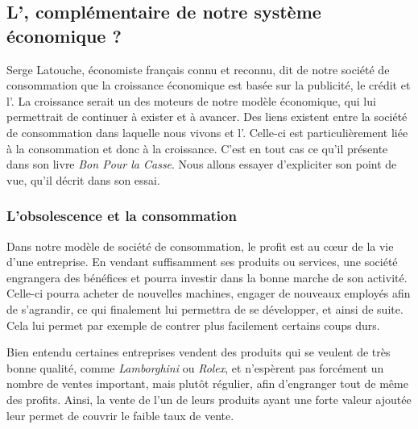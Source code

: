 \subsection{L'\OP, complémentaire de notre système\\ économique ?}

Serge Latouche, économiste français connu et reconnu, dit de notre société de consommation que la croissance économique est basée sur la publicité, le crédit et l'\op. La croissance serait un des moteurs de notre modèle économique, qui lui permettrait de continuer à exister et à avancer. Des liens existent entre la société de consommation dans laquelle nous vivons et l'\op. Celle-ci est particulièrement liée à la consommation et donc à la croissance. C'est en tout cas ce qu'il présente dans son livre \textit{Bon Pour la Casse}. Nous allons essayer d'expliciter son point de vue, qu'il décrit dans son essai.


\subsubsection{L'obsolescence et la consommation}
Dans notre modèle de société de consommation, le profit est au cœur de la vie d'une entreprise. En vendant suffisamment ses produits ou services, une société engrangera des bénéfices et pourra investir dans la bonne marche de son activité. Celle-ci pourra acheter de nouvelles machines, engager de nouveaux employés afin de s'agrandir, ce qui finalement lui permettra de se développer, et ainsi de suite. Cela lui permet par exemple de contrer plus facilement certains coups durs.

Bien entendu certaines entreprises vendent des produits qui se veulent de très bonne qualité, comme \textit{Lamborghini} ou \textit{Rolex}, et n'espèrent pas forcément un nombre de ventes important, mais plutôt régulier, afin d'engranger tout de même des profits. Ainsi, la vente de l'un de leurs produits ayant une forte valeur ajoutée leur permet de couvrir le faible taux de vente.


